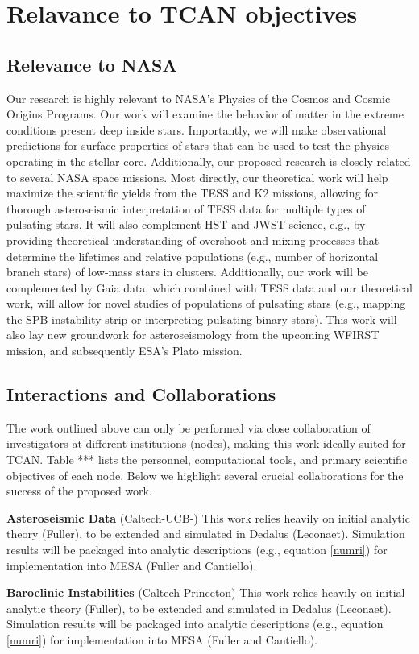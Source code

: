 {\color{orange}

\section{Relavance to TCAN objectives}

}

\subsection{Relevance to NASA}

Our research is highly relevant to NASA's Physics of the Cosmos and Cosmic Origins Programs. Our work will examine the behavior of matter in the extreme conditions present deep inside stars. Importantly, we will make observational predictions for surface properties of stars that can be used to test the physics operating in the stellar core. Additionally, our proposed research is closely related to several NASA space missions. Most directly, our theoretical work will help maximize the scientific yields from the TESS and K2 missions, allowing for thorough asteroseismic interpretation of TESS data for multiple types of pulsating stars. It will also complement HST and JWST science, e.g., by providing theoretical understanding of overshoot and mixing processes that determine the lifetimes and relative populations (e.g., number of horizontal branch stars) of low-mass stars in clusters. Additionally, our work will be complemented by Gaia data, which combined with TESS data and our theoretical work, will allow for novel studies of populations of pulsating stars (e.g., mapping the SPB instability strip or interpreting pulsating binary stars). This work will also lay new groundwork for asteroseismology from the upcoming WFIRST mission, and subsequently ESA's Plato mission. 


\subsection{Interactions and Collaborations}

The work outlined above can only be performed via close collaboration of investigators at different institutions (nodes), making this work ideally suited for TCAN. Table *** lists the personnel, computational tools, and primary scientific objectives of each node. Below we highlight several crucial collaborations for the success of the proposed work.

{\bf Asteroseismic Data} (Caltech-UCB-) This work relies heavily on initial analytic theory (Fuller), to be extended and simulated in Dedalus (Leconaet). Simulation results will be packaged into analytic descriptions (e.g., equation \ref{numri}) for implementation into MESA (Fuller and Cantiello).

{\bf Baroclinic Instabilities} (Caltech-Princeton) This work relies heavily on initial analytic theory (Fuller), to be extended and simulated in Dedalus (Leconaet). Simulation results will be packaged into analytic descriptions (e.g., equation \ref{numri}) for implementation into MESA (Fuller and Cantiello).

